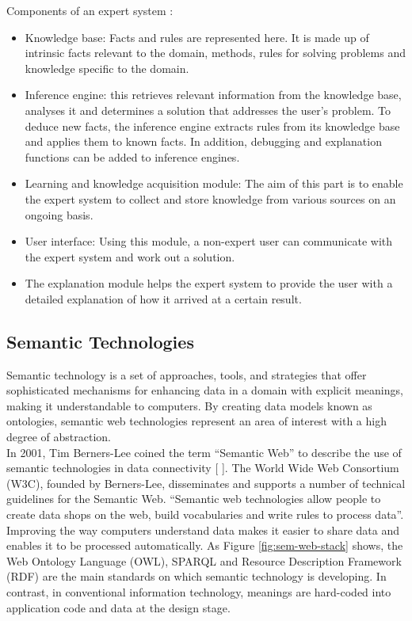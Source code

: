 Components of an expert system : 
\begin{itemize}
    \item Knowledge base: Facts and rules are represented here. It is made up of intrinsic facts relevant to the domain, methods, rules for solving problems and knowledge specific to the domain.
    \item Inference engine: this retrieves relevant information from the knowledge base, analyses it and determines a solution that addresses the user's problem. To deduce new facts, the inference engine extracts rules from its knowledge base and applies them to known facts. In addition, debugging and explanation functions can be added to inference engines.
    \item Learning and knowledge acquisition module: The aim of this part is to enable the expert system to collect and store knowledge from various sources on an ongoing basis.
    \item User interface: Using this module, a non-expert user can communicate with the expert system and work out a solution.
    \item The explanation module helps the expert system to provide the user with a detailed explanation of how it arrived at a certain result.
\end{itemize}


\subsection{Semantic Technologies\label{sec:semtec}}
Semantic technology is a set of approaches, tools, and strategies that offer sophisticated mechanisms for enhancing data in a domain with explicit meanings, making it understandable to computers. By creating data models known as ontologies, semantic web technologies represent an area of interest with a high degree of abstraction.\\ 

In 2001, Tim Berners-Lee coined the term “Semantic Web” to describe the use of semantic technologies in data connectivity [ ]. The World Wide Web Consortium (W3C), founded by Berners-Lee, disseminates and supports a number of technical guidelines for the Semantic Web. “Semantic web technologies allow people to create data shops on the web, build vocabularies and write rules to process data”.\\

Improving the way computers understand data makes it easier to share data and enables it to be processed automatically. As Figure \ref{fig:sem-web-stack} shows, the Web Ontology Language (OWL), SPARQL and Resource Description Framework (RDF) are the main standards on which semantic technology is developing. In contrast, in conventional information technology, meanings are hard-coded into application code and data at the design stage. \\

